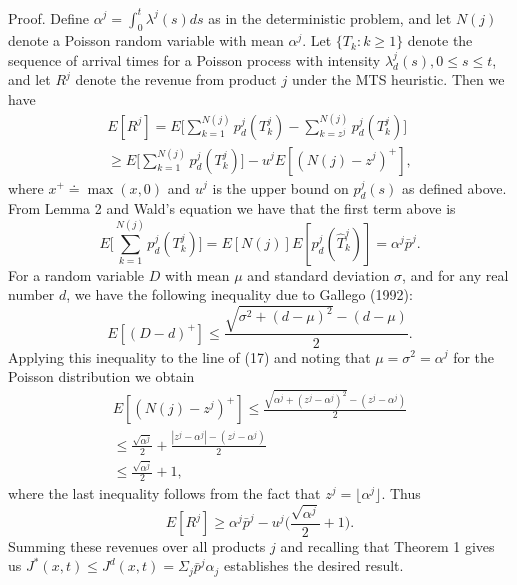 Proof. Define \(\alpha^j = \int_{0}^{t} \lambda^j(s)  ds\) as in the deterministic problem, and let \(N(j)\) denote a Poisson random variable with mean \(\alpha^j\). Let \(\{ T_k : k \geqslant 1 \}\) denote the sequence of arrival times for a Poisson process with intensity \(\lambda_d^j(s), 0 \leqslant s \leqslant t\), and let \(R^j\) denote the revenue from product \(j\) under the MTS heuristic. Then we have
\[
\begin{array}{l}
\displaystyle E [R^j] = E \biggl[ \sum_{k=1}^{N(j)} p_d^j(T_k^j) - \sum_{k=z^j}^{N(j)} p_d^j(T_k^j) \biggr] \\
\displaystyle \geqslant E \biggl[ \sum_{k=1}^{N(j)} p_d^j(T_k^j) \biggr] - u^j E [(N(j) - z^j)^{+}] ,
\end{array}
\]
where \(x^{+} \doteq \operatorname*{max} (x, 0)\) and \(u^j\) is the upper bound on \(p_d^j(s)\) as defined above. From Lemma 2 and Wald's equation we have that the first term above is
\[
E \Big[ \sum_{k=1}^{N(j)} p_d^j(T_k^j) \Big] = E [N(j)] E [p_d^j(\hat{T}_k^j)] = \alpha^j \bar{p}^j .
\]
For a random variable \(D\) with mean \(\mu\) and standard deviation \(\sigma\), and for any real number \(d\), we have the following inequality due to Gallego (1992):
\[
E [(D - d)^{+}] \leqslant \frac{ \sqrt{ \sigma^{2} + (d - \mu)^2 } - (d - \mu) }{2} .
\]
Applying this inequality to the line of (17) and noting that \(\mu = \sigma^{2} = \alpha^j\) for the Poisson distribution we obtain
\[
\begin{array}{c}
\displaystyle E [(N(j) - z^j)^{+}] \leqslant \frac{ \sqrt{ \alpha^j + (z^j - \alpha^j)^2 } - (z^j - \alpha^j) }{2} \\
\displaystyle \leqslant \frac{ \sqrt{ \alpha^j } }{2} + \frac{ |z^j - \alpha^j| - (z^j - \alpha^j) }{2} \\
\displaystyle \leqslant \frac{ \sqrt{ \alpha^j } }{2} + 1 ,
\end{array}
\]
where the last inequality follows from the fact that \(z^j = \lfloor \alpha^j \rfloor\). Thus
\[
E [R^j] \geqslant \alpha^j \bar{p}^j - u^j \biggl( \frac{ \sqrt{ \alpha^j } }{2} + 1 \biggr) .
\]
Summing these revenues over all products \(j\) and recalling that Theorem 1 gives us \(J^{*}(x, t) \leqslant J^{d}(x, t) = \Sigma_j \bar{p}^j \alpha_j\) establishes the desired result.

